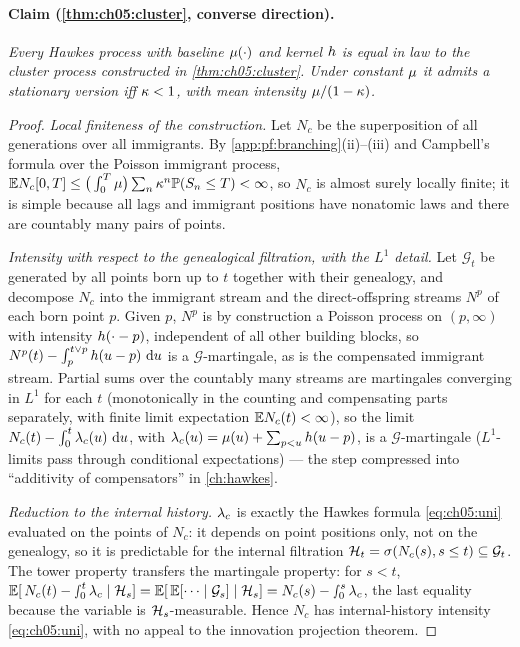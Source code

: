 \paragraph{Claim (\cref{thm:ch05:cluster}, converse direction).}
\emph{Every Hawkes process with baseline $\mu(\cdot)$ and kernel $h$ is equal in law to the
cluster process constructed in \cref{thm:ch05:cluster}. Under constant $\mu$ it admits a stationary
version iff $\kappa < 1$, with mean intensity $\mu/(1-\kappa)$.}
\begin{proof}
\emph{Local finiteness of the construction.} Let $N_c$ be the superposition of all generations over
all immigrants. By \cref{app:pf:branching}(ii)--(iii) and Campbell's formula over the Poisson
immigrant process, $\mathbb{E} N_c[0,T] \le \big(\int_0^T \mu\big) \sum_n \kappa^n \mathbb{P}(S_n \le T) <
\infty$, so $N_c$ is almost surely locally finite; it is simple because all lags and immigrant
positions have nonatomic laws and there are countably many pairs of points.

\emph{Intensity with respect to the genealogical filtration, with the $L^1$ detail.} Let
$\mathcal{G}_t$ be generated by all points born up to $t$ together with their genealogy, and decompose
$N_c$ into the immigrant stream and the direct-offspring streams $N^p$ of each born point $p$. Given
$p$, $N^p$ is by construction a Poisson process on $(p, \infty)$ with intensity $h(\cdot - p)$,
independent of all other building blocks, so $N^p(t) - \int_p^{t \vee p} h(u - p)\, \,\mathrm{d} u$ is a
$\mathcal{G}$-martingale, as is the compensated immigrant stream. Partial sums over the countably many
streams are martingales converging in $L^1$ for each $t$ (monotonically in the counting and
compensating parts separately, with finite limit expectation $\mathbb{E} N_c(t) < \infty$), so the limit
$N_c(t) - \int_0^t \lambda_c(u)\, \,\mathrm{d} u$, with $\lambda_c(u) = \mu(u) + \sum_{p < u} h(u - p)$, is a
$\mathcal{G}$-martingale ($L^1$-limits pass through conditional expectations) --- the step compressed
into ``additivity of compensators'' in \cref{ch:hawkes}.

\emph{Reduction to the internal history.} $\lambda_c$ is exactly the Hawkes formula \cref{eq:ch05:uni}
evaluated on the points of $N_c$: it depends on point positions only, not on the genealogy, so it is
predictable for the internal filtration $\mathcal{H}_t = \sigma(N_c(s), s \le t) \subseteq \mathcal{G}_t$.
The tower property transfers the martingale property: for $s < t$, $\mathbb{E}[\,N_c(t) - \smallint_0^t
\lambda_c \mid \mathcal{H}_s] = \mathbb{E}[\,\mathbb{E}[\cdots \mid \mathcal{G}_s] \mid \mathcal{H}_s] = N_c(s) - \smallint_0^s
\lambda_c$, the last equality because the variable is $\mathcal{H}_s$-measurable. Hence $N_c$ has
internal-history intensity \cref{eq:ch05:uni}, with no appeal to the innovation projection theorem.


\end{proof}
